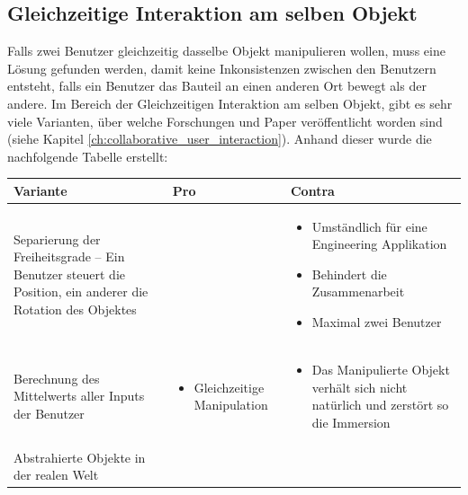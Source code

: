 \subsection{Gleichzeitige Interaktion am selben Objekt}
\label{ch:gleichzeitige_interaktion}
Falls zwei Benutzer gleichzeitig dasselbe Objekt manipulieren wollen, muss eine Lösung gefunden werden, damit keine Inkonsistenzen zwischen den Benutzern entsteht, falls ein Benutzer das Bauteil an einen anderen Ort bewegt als der andere. Im Bereich der Gleichzeitigen Interaktion am selben Objekt, gibt es sehr viele Varianten, über welche Forschungen und Paper veröffentlicht worden sind (siehe Kapitel \ref{ch:collaborative_user_interaction}). Anhand dieser wurde die nachfolgende Tabelle erstellt:

\begin{center}
	\begin{tabularx} {\textwidth} { | B | B | B | }
		\hline
		\color{white} \textbf{Variante} & \color{white} \textbf{Pro} & 
		\color{white} \textbf{Contra} \\
		\hline
		\vspace{1pt}
		Separierung der Freiheitsgrade – Ein Benutzer steuert die Position, ein anderer die Rotation des Objektes &  &
		\begin{itemize} [leftmargin=*,noitemsep,topsep=0pt]
			\item Umständlich für eine Engineering Applikation
			\item Behindert die Zusammenarbeit
			\item Maximal zwei Benutzer
		\end{itemize} \\
		\hline
		\vspace{1pt}
		Berechnung des Mittelwerts aller Inputs der Benutzer & 
		\begin{itemize} [leftmargin=*,noitemsep,topsep=0pt]
			\item Gleichzeitige Manipulation
		\end{itemize} & 
		\begin{itemize} [leftmargin=*,noitemsep,topsep=0pt]
			\item Das Manipulierte Objekt verhält sich nicht natürlich und zerstört so die Immersion
		\end{itemize} \\
		\hline
		\vspace{1pt}
		Abstrahierte Objekte in der realen Welt & 
		\begin{itemize} [leftmargin=*,noitemsep,topsep=0pt]

\end{itemize}
\end{tabularx}
\end{center}
